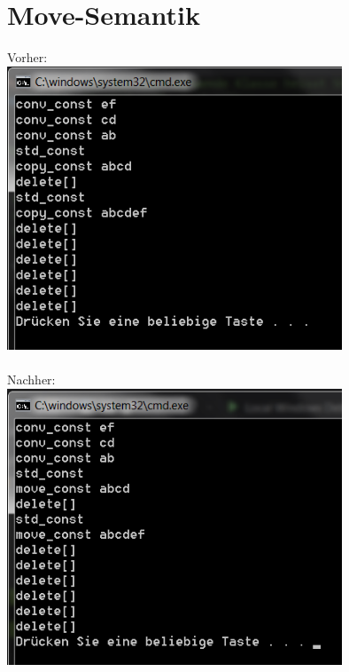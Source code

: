 \documentclass[a4paper,10pt]{article}
\begin{document}
\section{Move-Semantik}
Vorher:\\
\includegraphics[width=100mm]{move_before.png}\\\\
Nachher:\\
\includegraphics[width=100mm]{move_after.png}\\\\
\end{document}
